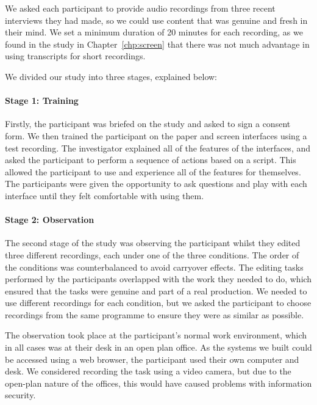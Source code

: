
We asked each participant to provide audio recordings from three recent interviews they had made, so we could use
content that was genuine and fresh in their mind. We set a minimum duration of 20 minutes for each recording, as we
found in the study in Chapter~\ref{chp:screen} that there was not much advantage in using transcripts for
short recordings.

We divided our study into three stages, explained below:

\paragraph{Stage 1: Training}

Firstly, the participant was briefed on the study and asked to sign a consent form.  We then trained the
participant on the paper and screen interfaces using a test recording.  The investigator explained all of the features
of the interfaces, and asked the participant to perform a sequence of actions based on a script. This allowed the
participant to use and experience all of the features for themselves. The participants were given the opportunity to
ask questions and play with each interface until they felt comfortable with using them.

\paragraph{Stage 2: Observation}

The second stage of the study was observing the participant whilst they edited three different recordings, each under
one of the three conditions.  The order of the conditions was counterbalanced to avoid carryover effects.  The editing
tasks performed by the participants overlapped with the work they needed to do, which ensured that the tasks
were genuine and part of a real production.  We needed to use different recordings for each condition, but we asked the
participant to choose recordings from the same programme to ensure they were as similar as possible.

The observation took place at the participant's normal work environment, which in all cases was at their desk in an
open plan office. As the systems we built could be accessed using a web browser, the participant used their own
computer and desk. We considered recording the task using a video camera, but due to the open-plan nature of the
offices, this would have caused problems with information security.

